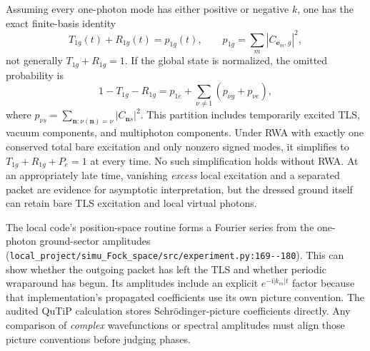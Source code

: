\documentclass[11pt,a4paper]{article}
\newcommand{\code}[1]{\nolinkurl{#1}}
\newcommand{\ii}{\mathrm i}
\begin{document}
Assuming every one-photon mode has either positive or negative $k$, one has the exact finite-basis identity
\begin{equation}
 T_{1g}(t)+R_{1g}(t)=p_{1g}(t),\qquad
 p_{1g}=\sum_{m}|C_{\mathbf e_m,g}|^2,
 \label{eq:TRsum}
\end{equation}
not generally $T_{1g}+R_{1g}=1$. If the global state is normalized, the omitted probability is
\begin{equation}
 1-T_{1g}-R_{1g}=p_{1e}+\sum_{\nu\ne1}(p_{\nu g}+p_{\nu e}),
 \label{eq:missing}
\end{equation}
where $p_{\nu s}=\sum_{\mathbf n:\nu(\mathbf n)=\nu}|C_{\mathbf n s}|^2$. This partition includes temporarily excited TLS, vacuum components, and multiphoton components. Under RWA with exactly one conserved total bare excitation and only nonzero signed modes, it simplifies to $T_{1g}+R_{1g}+P_e=1$ at every time. No such simplification holds without RWA. At an appropriately late time, vanishing \emph{excess} local excitation and a separated packet are evidence for asymptotic interpretation, but the dressed ground itself can retain bare TLS excitation and local virtual photons.

The local code's position-space routine forms a Fourier series from the one-photon ground-sector amplitudes (\code{local_project/simu_Fock_space/src/experiment.py:169--180}). This can show whether the outgoing packet has left the TLS and whether periodic wraparound has begun. Its amplitudes include an explicit $e^{-\ii|k_m|t}$ factor because that implementation's propagated coefficients use its own picture convention. The audited QuTiP calculation stores Schr\"odinger-picture coefficients directly. Any comparison of \emph{complex} wavefunctions or spectral amplitudes must align those picture conventions before judging phases.
\end{document}
